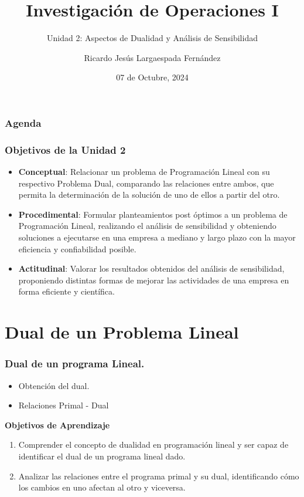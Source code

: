 \documentclass{beamer}
\title{Investigación de Operaciones I}
\subtitle{Unidad 2: Aspectos de Dualidad y Análisis de Sensibilidad}
\author[Ricardo Largaespada]{Ricardo Jesús Largaespada Fernández}
\institute[UNI]{Ingeniería de Sistemas, DACTIC, UNI}
\date{07 de Octubre, 2024}
\begin{document}
\frame{\titlepage}

\begin{frame}
\frametitle{Agenda}
\tableofcontents
\end{frame}

\begin{frame}
\frametitle{Objetivos de la Unidad 2}
\begin{itemize}
    \item \textbf{Conceptual}: Relacionar un problema de Programación Lineal con su respectivo Problema Dual, comparando las relaciones entre ambos, que permita la determinación de la solución de uno de ellos a partir del otro.
    \item \textbf{Procedimental}: Formular planteamientos post óptimos a un problema de Programación Lineal, realizando el análisis de sensibilidad y obteniendo soluciones a ejecutarse en una empresa a mediano y largo plazo con la mayor eficiencia y confiabilidad posible.
    \item \textbf{Actitudinal}: Valorar los resultados obtenidos del análisis de sensibilidad, proponiendo distintas formas de mejorar las actividades de una empresa en forma eficiente y científica.
\end{itemize}
\end{frame}

\section{Dual de un Problema Lineal}
\begin{frame}
\frametitle{Dual de un programa Lineal.}
\begin{itemize}
\item Obtención del dual.\\
\item Relaciones Primal - Dual
\end{itemize}
\pause
\textbf{Objetivos de Aprendizaje}
    \begin{enumerate}
        \item Comprender el concepto de dualidad en programación lineal y ser capaz de identificar el dual de un programa lineal dado.
        \item Analizar las relaciones entre el programa primal y su dual, identificando cómo los cambios en uno afectan al otro y viceversa.
    \end{enumerate}
\end{frame}
\end{document}
